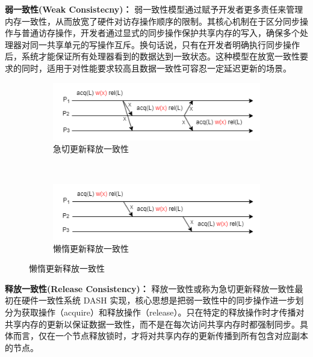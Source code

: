 {\textbf{弱一致性(Weak Consistecny)：} 弱一致性模型通过赋予开发者更多责任来管理内存一致性，从而放宽了硬件对访存操作顺序的限制。其核心机制在于区分同步操作与普通访存操作，开发者通过显式的同步操作保护共享内存的写入，确保多个处理器对同一共享单元的写操作互斥。换句话说，只有在开发者明确执行同步操作后，系统才能保证所有处理器看到的数据达到一致状态。这种模型在放宽一致性要求的同时，适用于对性能要求较高且数据一致性可容忍一定延迟更新的场景。
\begin{figure}[!htbp]
    \centering
    \begin{subfigure}[b]{0.8\textwidth}
        \includegraphics[width=\textwidth]{Img/eager-release-consistency.png}
        \caption{急切更新释放一致性}
        \label{fig:eager-release-consistency}
    \end{subfigure}
    \\
    \begin{subfigure}[b]{0.8\textwidth}
    \includegraphics[width=\textwidth]{Img/lazy-release-consistency.png}
    \caption{懒惰更新释放一致性}
    \label{fig:lazy-release-consistency}
    \end{subfigure}
    
    \label{fig:oaspl}    
\end{figure}

\textbf{释放一致性(Release Consistency)：} 释放一致性或称为急切更新释放一致性最初在硬件一致性系统 DASH 实现，核心思想是把弱一致性中的同步操作进一步划分为获取操作（acquire）和释放操作（release）。只在特定的释放操作时才传播对共享内存的更新以保证数据一致性，而不是在每次访问共享内存时都强制同步。具体而言，仅在一个节点释放锁时，才将对共享内存的更新传播到所有包含对应副本的节点。

}
